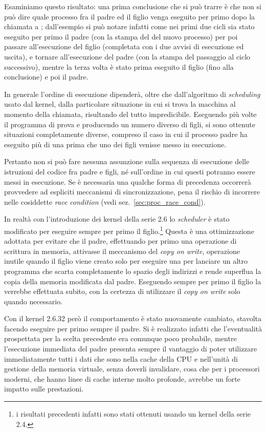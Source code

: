 Esaminiamo questo risultato: una prima conclusione che si può trarre è che non
si può dire quale processo fra il padre ed il figlio venga eseguito per primo
dopo la chiamata a ; dall'esempio si può notare infatti come nei
primi due cicli sia stato eseguito per primo il padre (con la stampa del
 del nuovo processo) per poi passare all'esecuzione del figlio
(completata con i due avvisi di esecuzione ed uscita), e tornare
all'esecuzione del padre (con la stampa del passaggio al ciclo successivo),
mentre la terza volta è stato prima eseguito il figlio (fino alla conclusione)
e poi il padre.

In generale l'ordine di esecuzione dipenderà, oltre che dall'algoritmo di
\textit{scheduling} usato dal kernel, dalla particolare situazione in cui si
trova la macchina al momento della chiamata, risultando del tutto
impredicibile.  Eseguendo più volte il programma di prova e producendo un
numero diverso di figli, si sono ottenute situazioni completamente diverse,
compreso il caso in cui il processo padre ha eseguito più di una 
prima che uno dei figli venisse messo in esecuzione.

Pertanto non si può fare nessuna assunzione sulla sequenza di esecuzione delle
istruzioni del codice fra padre e figli, né sull'ordine in cui questi potranno
essere messi in esecuzione. Se è necessaria una qualche forma di precedenza
occorrerà provvedere ad espliciti meccanismi di sincronizzazione, pena il
rischio di incorrere nelle cosiddette \textit{race condition} (vedi
sez.~\ref{sec:proc_race_cond}).

In realtà con l'introduzione dei kernel della serie 2.6 lo \textit{scheduler}
è stato modificato per eseguire sempre per primo il figlio.\footnote{i
  risultati precedenti infatti sono stati ottenuti usando un kernel della
  serie 2.4.}  Questa è una ottimizzazione adottata per evitare che il padre,
effettuando per primo una operazione di scrittura in memoria, attivasse il
meccanismo del \textit{copy on write}, operazione inutile quando il figlio
viene creato solo per eseguire una  per lanciare un altro programma
che scarta completamente lo spazio degli indirizzi e rende superflua la copia
della memoria modificata dal padre. Eseguendo sempre per primo il figlio la
 verrebbe effettuata subito, con la certezza di utilizzare il
\textit{copy on write} solo quando necessario.

Con il kernel 2.6.32 però il comportamento è stato nuovamente cambiato,
stavolta facendo eseguire per primo sempre il padre. Si è realizzato infatti
che l'eventualità prospettata per la scelta precedente era comunque poco
probabile, mentre l'esecuzione immediata del padre presenta sempre il
vantaggio di poter utilizzare immediatamente tutti i dati che sono nella cache
della CPU e nell'unità di gestione della memoria virtuale, senza doverli
invalidare, cosa che per i processori moderni, che hanno linee di cache
interne molto profonde, avrebbe un forte impatto sulle prestazioni.

